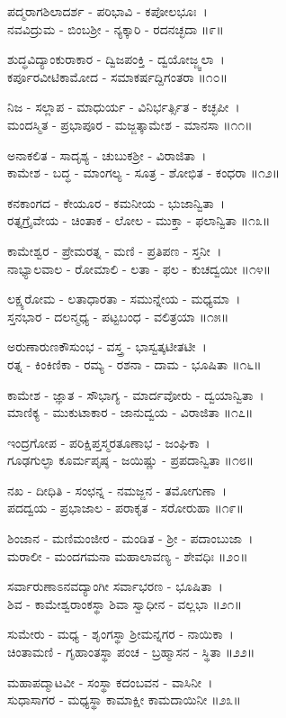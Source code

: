 ಪದ್ಮರಾಗಶಿಲಾದರ್ಶ - ಪರಿಭಾವಿ - ಕಪೋಲಭೂಃ~।\\
ನವವಿದ್ರುಮ - ಬಿಂಬಶ್ರೀ - ನ್ಯಕ್ಕಾರಿ - ರದನಚ್ಛದಾ ॥೯॥

ಶುದ್ಧವಿದ್ಯಾಂಕುರಾಕಾರ - ದ್ವಿಜಪಂಕ್ತಿ - ದ್ವಯೋಜ್ಜ್ವಲಾ~।\\
ಕರ್ಪೂರವೀಟಿಕಾಮೋದ - ಸಮಾಕರ್ಷದ್ದಿಗಂತರಾ ॥೧೦॥

ನಿಜ - ಸಲ್ಲಾಪ - ಮಾಧುರ್ಯ - ವಿನಿರ್ಭರ್ತ್ಸಿತ - ಕಚ್ಛಪೀ~।\\
ಮಂದಸ್ಮಿತ - ಪ್ರಭಾಪೂರ - ಮಜ್ಜತ್ಕಾಮೇಶ - ಮಾನಸಾ ॥೧೧॥

ಅನಾಕಲಿತ - ಸಾದೃಶ್ಯ - ಚುಬುಕಶ್ರೀ - ವಿರಾಜಿತಾ~।\\
ಕಾಮೇಶ - ಬದ್ಧ - ಮಾಂಗಲ್ಯ - ಸೂತ್ರ - ಶೋಭಿತ - ಕಂಧರಾ ॥೧೨॥

ಕನಕಾಂಗದ - ಕೇಯೂರ - ಕಮನೀಯ - ಭುಜಾನ್ವಿತಾ~।\\
ರತ್ನಗ್ರೈವೇಯ - ಚಿಂತಾಕ - ಲೋಲ - ಮುಕ್ತಾ - ಫಲಾನ್ವಿತಾ ॥೧೩॥

ಕಾಮೇಶ್ವರ - ಪ್ರೇಮರತ್ನ - ಮಣಿ - ಪ್ರತಿಪಣ - ಸ್ತನೀ~।\\
ನಾಭ್ಯಾಲವಾಲ - ರೋಮಾಲಿ - ಲತಾ - ಫಲ - ಕುಚದ್ವಯೀ ॥೧೪॥

ಲಕ್ಷ್ಯರೋಮ - ಲತಾಧಾರತಾ - ಸಮುನ್ನೇಯ - ಮಧ್ಯಮಾ~।\\
ಸ್ತನಭಾರ - ದಲನ್ಮಧ್ಯ - ಪಟ್ಟಬಂಧ - ವಲಿತ್ರಯಾ ॥೧೫॥

ಅರುಣಾರುಣಕೌಸುಂಭ - ವಸ್ತ್ರ - ಭಾಸ್ವತ್ಕಟೀತಟೀ~।\\
ರತ್ನ - ಕಿಂಕಿಣಿಕಾ - ರಮ್ಯ - ರಶನಾ - ದಾಮ - ಭೂಷಿತಾ ॥೧೬॥

ಕಾಮೇಶ - ಜ್ಞಾತ - ಸೌಭಾಗ್ಯ - ಮಾರ್ದವೋರು - ದ್ವಯಾನ್ವಿತಾ~।\\
ಮಾಣಿಕ್ಯ - ಮುಕುಟಾಕಾರ - ಜಾನುದ್ವಯ - ವಿರಾಜಿತಾ ॥೧೭॥

ಇಂದ್ರಗೋಪ - ಪರಿಕ್ಷಿಪ್ತಸ್ಮರತೂಣಾಭ - ಜಂಘಿಕಾ~।\\
ಗೂಢಗುಲ್ಫಾ ಕೂರ್ಮಪೃಷ್ಠ - ಜಯಿಷ್ಣು - ಪ್ರಪದಾನ್ವಿತಾ ॥೧೮॥

ನಖ - ದೀಧಿತಿ - ಸಂಛನ್ನ - ನಮಜ್ಜನ - ತಮೋಗುಣಾ~।\\
ಪದದ್ವಯ - ಪ್ರಭಾಜಾಲ - ಪರಾಕೃತ - ಸರೋರುಹಾ ॥೧೯॥

ಶಿಂಜಾನ - ಮಣಿಮಂಜೀರ - ಮಂಡಿತ - ಶ್ರೀ - ಪದಾಂಬುಜಾ~।\\
ಮರಾಲೀ - ಮಂದಗಮನಾ ಮಹಾಲಾವಣ್ಯ - ಶೇವಧಿಃ ॥೨೦॥

ಸರ್ವಾರುಣಾಽನವದ್ಯಾಂಗೀ ಸರ್ವಾಭರಣ - ಭೂಷಿತಾ~।\\
ಶಿವ - ಕಾಮೇಶ್ವರಾಂಕಸ್ಥಾ ಶಿವಾ ಸ್ವಾಧೀನ - ವಲ್ಲಭಾ ॥೨೧॥

ಸುಮೇರು - ಮಧ್ಯ - ಶೃಂಗಸ್ಥಾ ಶ್ರೀಮನ್ನಗರ - ನಾಯಿಕಾ~।\\
ಚಿಂತಾಮಣಿ - ಗೃಹಾಂತಸ್ಥಾ ಪಂಚ - ಬ್ರಹ್ಮಾಸನ - ಸ್ಥಿತಾ ॥೨೨॥

ಮಹಾಪದ್ಮಾಟವೀ - ಸಂಸ್ಥಾ ಕದಂಬವನ - ವಾಸಿನೀ~।\\
ಸುಧಾಸಾಗರ - ಮಧ್ಯಸ್ಥಾ ಕಾಮಾಕ್ಷೀ ಕಾಮದಾಯಿನೀ ॥೨೩॥

